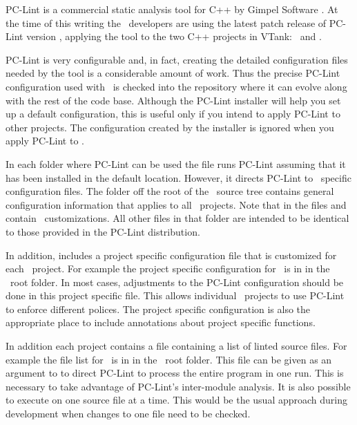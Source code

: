 PC-Lint is a commercial static analysis tool for C++ by Gimpel Software \cite{pc-lint}. At the time of this writing the \VTank\ developers are using the latest patch release of PC-Lint version \PCLintVersion, applying the tool to the two C++ projects in VTank: \GameServer\ and \MapEditor.

PC-Lint is very configurable and, in fact, creating the detailed configuration files needed by the tool is a considerable amount of work. Thus the precise PC-Lint configuration used with \VTank\ is checked into the repository where it can evolve along with the rest of the code base. Although the PC-Lint installer will help you set up a default configuration, this is useful only if you intend to apply PC-Lint to other projects. The configuration created by the installer is ignored when you apply PC-Lint to \VTank.

In each folder where PC-Lint can be used the file  runs PC-Lint assuming that it has been installed in the default location. However, it directs PC-Lint to \VTank\ specific configuration files. The  folder off the root of the \VTank\ source tree contains general configuration information that applies to all \VTank\ projects. Note that in  the files  and  contain \VTank\ customizations. All other files in that folder are intended to be identical to those provided in the PC-Lint distribution.

In addition,  includes a project specific configuration file that is customized for each \VTank\ project. For example the project specific configuration for \MapEditor\ is in  in the \MapEditor\ root folder. In most cases, adjustments to the PC-Lint configuration should be done in this project specific file. This allows individual \VTank\ projects to use PC-Lint to enforce different polices. The project specific configuration is also the appropriate place to include annotations about project specific functions.

In addition each project contains a file containing a list of linted source files. For example the file list for \MapEditor\ is in  in the \MapEditor\ root folder. This file can be given as an argument to  to direct PC-Lint to process the entire program in one run. This is necessary to take advantage of PC-Lint's inter-module analysis. It is also possible to execute  on one source file at a time. This would be the usual approach during development when changes to one file need to be checked.

